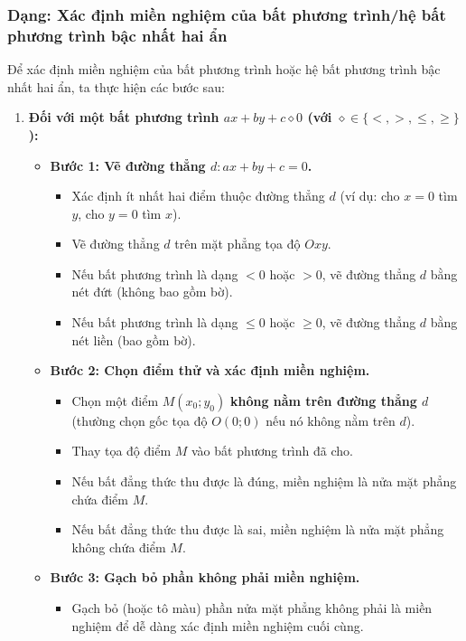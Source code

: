 \subsubsection{Dạng: Xác định miền nghiệm của bất phương trình/hệ bất phương trình bậc nhất hai ẩn}
\begin{phuongphap}
Để xác định miền nghiệm của bất phương trình hoặc hệ bất phương trình bậc nhất hai ẩn, ta thực hiện các bước sau:
\begin{enumerate}
    \item \textbf{Đối với một bất phương trình $ax + by + c \diamond 0$ (với $\diamond \in \{<, >, \le, \ge\}$):}
    \begin{itemize}
        \item \textbf{Bước 1: Vẽ đường thẳng $d: ax + by + c = 0$.}
        \begin{itemize}
            \item Xác định ít nhất hai điểm thuộc đường thẳng $d$ (ví dụ: cho $x=0$ tìm $y$, cho $y=0$ tìm $x$).
            \item Vẽ đường thẳng $d$ trên mặt phẳng tọa độ $Oxy$.
            \item Nếu bất phương trình là dạng $<0$ hoặc $>0$, vẽ đường thẳng $d$ bằng nét đứt (không bao gồm bờ).
            \item Nếu bất phương trình là dạng $\le0$ hoặc $\ge0$, vẽ đường thẳng $d$ bằng nét liền (bao gồm bờ).
        \end{itemize}
        \item \textbf{Bước 2: Chọn điểm thử và xác định miền nghiệm.}
        \begin{itemize}
            \item Chọn một điểm $M(x_0; y_0)$ \textbf{không nằm trên đường thẳng $d$} (thường chọn gốc tọa độ $O(0;0)$ nếu nó không nằm trên $d$).
            \item Thay tọa độ điểm $M$ vào bất phương trình đã cho.
            \item Nếu bất đẳng thức thu được là đúng, miền nghiệm là nửa mặt phẳng chứa điểm $M$.
            \item Nếu bất đẳng thức thu được là sai, miền nghiệm là nửa mặt phẳng không chứa điểm $M$.
        \end{itemize}
        \item \textbf{Bước 3: Gạch bỏ phần không phải miền nghiệm.}
        \begin{itemize}
            \item Gạch bỏ (hoặc tô màu) phần nửa mặt phẳng không phải là miền nghiệm để dễ dàng xác định miền nghiệm cuối cùng.

\end{itemize}
\end{itemize}
\end{enumerate}
\end{phuongphap}

